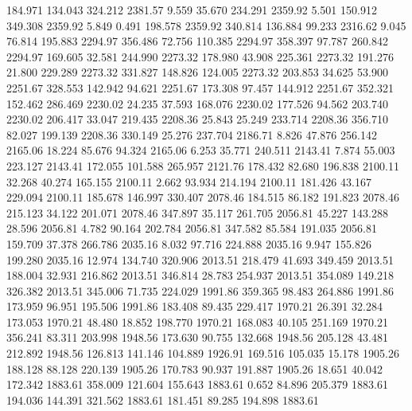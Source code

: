  184.971  134.043  324.212      2381.57
   9.559   35.670  234.291      2359.92
   5.501  150.912  349.308      2359.92
   5.849    0.491  198.578      2359.92
 340.814  136.884   99.233      2316.62
   9.045   76.814  195.883      2294.97
 356.486   72.756  110.385      2294.97
 358.397   97.787  260.842      2294.97
 169.605   32.581  244.990      2273.32
 178.980   43.908  225.361      2273.32
 191.276   21.800  229.289      2273.32
 331.827  148.826  124.005      2273.32
 203.853   34.625   53.900      2251.67
 328.553  142.942   94.621      2251.67
 173.308   97.457  144.912      2251.67
 352.321  152.462  286.469      2230.02
  24.235   37.593  168.076      2230.02
 177.526   94.562  203.740      2230.02
 206.417   33.047  219.435      2208.36
  25.843   25.249  233.714      2208.36
 356.710   82.027  199.139      2208.36
 330.149   25.276  237.704      2186.71
   8.826   47.876  256.142      2165.06
  18.224   85.676   94.324      2165.06
   6.253   35.771  240.511      2143.41
   7.874   55.003  223.127      2143.41
 172.055  101.588  265.957      2121.76
 178.432   82.680  196.838      2100.11
  32.268   40.274  165.155      2100.11
   2.662   93.934  214.194      2100.11
 181.426   43.167  229.094      2100.11
 185.678  146.997  330.407      2078.46
 184.515   86.182  191.823      2078.46
 215.123   34.122  201.071      2078.46
 347.897   35.117  261.705      2056.81
  45.227  143.288   28.596      2056.81
   4.782   90.164  202.784      2056.81
 347.582   85.584  191.035      2056.81
 159.709   37.378  266.786      2035.16
   8.032   97.716  224.888      2035.16
   9.947  155.826  199.280      2035.16
  12.974  134.740  320.906      2013.51
 218.479   41.693  349.459      2013.51
 188.004   32.931  216.862      2013.51
 346.814   28.783  254.937      2013.51
 354.089  149.218  326.382      2013.51
 345.006   71.735  224.029      1991.86
 359.365   98.483  264.886      1991.86
 173.959   96.951  195.506      1991.86
 183.408   89.435  229.417      1970.21
  26.391   32.284  173.053      1970.21
  48.480   18.852  198.770      1970.21
 168.083   40.105  251.169      1970.21
 356.241   83.311  203.998      1948.56
 173.630   90.755  132.668      1948.56
 205.128   43.481  212.892      1948.56
 126.813  141.146  104.889      1926.91
 169.516  105.035   15.178      1905.26
 188.128   88.128  220.139      1905.26
 170.783   90.937  191.887      1905.26
  18.651   40.042  172.342      1883.61
 358.009  121.604  155.643      1883.61
   0.652   84.896  205.379      1883.61
 194.036  144.391  321.562      1883.61
 181.451   89.285  194.898      1883.61
